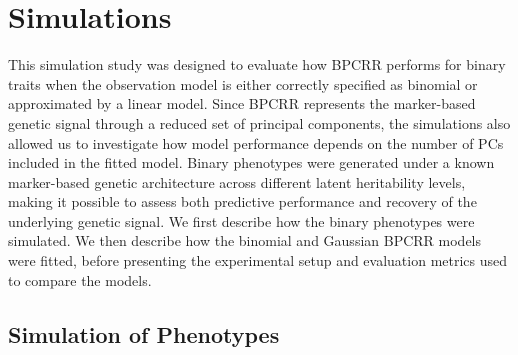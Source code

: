 



\section{Simulations}

This simulation study was designed to evaluate how BPCRR performs for binary traits when the observation model is either correctly specified as binomial or approximated by a linear model. Since BPCRR represents the marker-based genetic signal through a reduced set of principal components, the simulations also allowed us to investigate how model performance depends on the number of PCs included in the fitted model. Binary phenotypes were generated under a known marker-based genetic architecture across different latent heritability levels, making it possible to assess both predictive performance and recovery of the underlying genetic signal.
We first describe how the binary phenotypes were simulated. We then describe how the binomial and Gaussian BPCRR models were fitted, before presenting the experimental setup and evaluation metrics used to compare the models.

\subsection{Simulation of Phenotypes}

